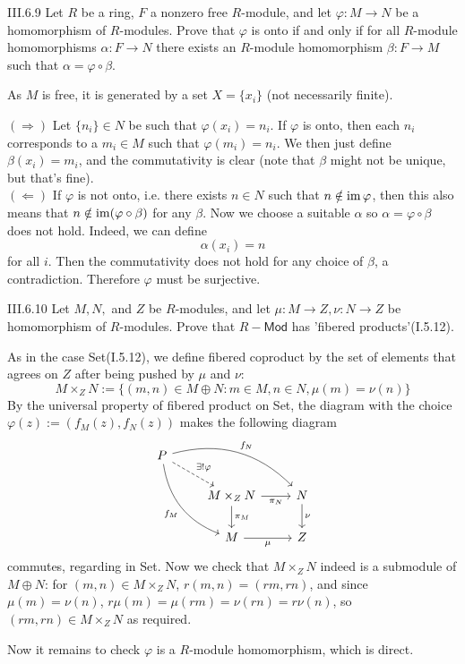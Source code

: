 \begin{problem}{III.6.9}
Let $R$ be a ring, $F$ a nonzero free $R$-module, and let $\varphi: M \to N$ be a homomorphism of $R$-modules. Prove that $\varphi$ is onto if and only if for all $R$-module homomorphisms $\alpha: F \to N$ there exists an $R$-module homomorphism $\beta:F \to M$ such that $\alpha = \varphi \circ \beta$.
\end{problem}
\begin{pf}
As $M$ is free, it is generated by a set $X = \{x_i\}$ (not necessarily finite). 

\noindent $(\Rightarrow)$ Let $\{n_i\} \in N$ be such that $\varphi(x_i) = n_i$. If $\varphi$ is onto, then each $n_i$ corresponds to a $m_i \in M$ such that $\varphi(m_i) = n_i$. We then just define $\beta(x_i) = m_i$, and the commutativity is clear (note that $\beta$ might not be unique, but that's fine). \\
$(\Leftarrow)$ If $\varphi$ is not onto, i.e. there exists $n \in N$ such that $n \notin \operatorname{im} \varphi$, then this also means that $n \notin \operatorname{im} (\varphi \circ \beta)$ for any $\beta$. Now we choose a suitable $\alpha$ so $\alpha = \varphi \circ \beta$ does not hold. Indeed, we can define
\[
\alpha(x_i) = n	
\]
for all $i$. Then the commutativity does not hold for any choice of $\beta$, a contradiction. Therefore $\varphi$ must be surjective.
\end{pf}


\begin{problem}{III.6.10}
Let $M,N,$ and $Z$ be $R$-modules, and let $\mu:M \to Z, \nu:N \to Z$ be homomorphism of $R$-modules. Prove that $R-\mathsf{Mod}$ has 'fibered products'(I.5.12).
\end{problem}
\begin{pf}
As in the case \textsf{Set}(I.5.12), we define fibered coproduct by the set of elements that agrees on $Z$ after being pushed by $\mu$ and $\nu$:
\[
M \times_Z N := \{(m,n)\in M \oplus N:m\in M, n \in N, \mu(m) = \nu(n)\}    
\]
By the universal property of fibered product on \textsf{Set}, the diagram with the choice $\varphi(z) := (f_M(z),f_N(z))$ makes the following diagram 
\[
\begin{tikzcd}
P \arrow[rd, "\exists!\varphi", dashed] \arrow[rdd, "f_M"', bend right] \arrow[rrd, "f_N", bend left] & & \\
& M \times_Z N \arrow[d, "\pi_M"] \arrow[r, "\pi_N"'] & N \arrow[d, "\nu"] \\
& M \arrow[r, "\mu"']  & Z                    
\end{tikzcd}    
\]
commutes, regarding in \textsf{Set}. Now we check that $M \times_Z N$ indeed is a submodule of $M \oplus N$: for $(m,n) \in M \times_Z N$, $r (m,n) = (rm,rn)$, and since $\mu(m)=\nu(n)$, $r\mu(m) = \mu(rm) = \nu(rn) = r\nu(n)$, so $(rm,rn) \in M \times_Z N$ as required.	

Now it remains to check $\varphi$ is a $R$-module homomorphism, which is direct.
\end{pf}

